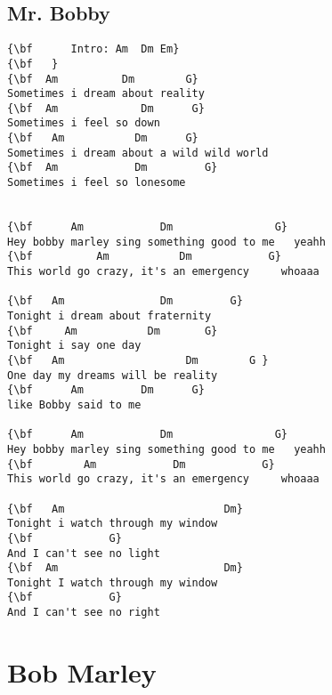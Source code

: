 \documentclass[a4paper]{article}
\begin{document}
\subsection{Mr. Bobby}
\begin{Verbatim}[commandchars=\\\{\}]
{\bf  	  Intro: Am  Dm Em}
{\bf   }
{\bf  Am          Dm        G}
Sometimes i dream about reality
{\bf  Am             Dm      G}
Sometimes i feel so down
{\bf   Am           Dm      G}
Sometimes i dream about a wild wild world
{\bf  Am            Dm         G}
Sometimes i feel so lonesome


{\bf      Am            Dm                G}
Hey bobby marley sing something good to me   yeahh
{\bf          Am           Dm            G}
This world go crazy, it's an emergency     whoaaa

{\bf   Am               Dm         G}
Tonight i dream about fraternity
{\bf     Am           Dm       G}
Tonight i say one day
{\bf   Am                   Dm        G }
One day my dreams will be reality
{\bf      Am         Dm      G}
like Bobby said to me

{\bf      Am            Dm                G}
Hey bobby marley sing something good to me   yeahh
{\bf        Am            Dm            G}
This world go crazy, it's an emergency     whoaaa

{\bf   Am                         Dm}
Tonight i watch through my window
{\bf            G}
And I can't see no light
{\bf  Am                          Dm}
Tonight I watch through my window
{\bf            G}
And I can't see no right

\end{Verbatim}
\newpage
\section{Bob Marley}
\end{document}
